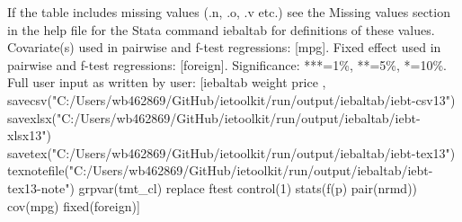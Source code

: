 If the table includes missing values (.n, .o, .v etc.) see the Missing values section in the help file for the Stata command iebaltab for definitions of these values. Covariate(s) used in pairwise and f-test regressions: [mpg]. Fixed effect used in pairwise and f-test regressions: [foreign]. Significance: ***=1\%, **=5\%, *=10\%. Full user input as written by user: [iebaltab weight price , savecsv("C:/Users/wb462869/GitHub/ietoolkit/run/output/iebaltab/iebt-csv13") savexlsx("C:/Users/wb462869/GitHub/ietoolkit/run/output/iebaltab/iebt-xlsx13") savetex("C:/Users/wb462869/GitHub/ietoolkit/run/output/iebaltab/iebt-tex13") texnotefile("C:/Users/wb462869/GitHub/ietoolkit/run/output/iebaltab/iebt-tex13-note") grpvar(tmt\_cl) replace ftest control(1) stats(f(p) pair(nrmd)) cov(mpg) fixed(foreign)]
